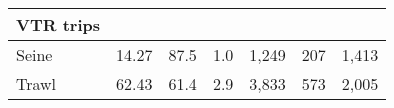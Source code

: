 \documentclass[]{article}
\begin{document}
\begin{longtable}[]{@{}lrrrrrr@{}}
\begin{minipage}[b]{0.08\columnwidth}
VTR trips\strut
\end{minipage}\tabularnewline
\midrule
\endhead
\begin{minipage}[t]{0.07\columnwidth}\raggedright\strut
Seine\strut
\end{minipage} & \begin{minipage}[t]{0.17\columnwidth}\raggedleft\strut
14.27\strut
\end{minipage} & \begin{minipage}[t]{0.11\columnwidth}\raggedleft\strut
87.5\strut
\end{minipage} & \begin{minipage}[t]{0.14\columnwidth}\raggedleft\strut
1.0\strut
\end{minipage} & \begin{minipage}[t]{0.15\columnwidth}\raggedleft\strut
1,249\strut
\end{minipage} & \begin{minipage}[t]{0.09\columnwidth}\raggedleft\strut
207\strut
\end{minipage} & \begin{minipage}[t]{0.08\columnwidth}\raggedleft\strut
1,413\strut
\end{minipage}\tabularnewline
\begin{minipage}[t]{0.07\columnwidth}\raggedright\strut
Trawl\strut
\end{minipage} & \begin{minipage}[t]{0.17\columnwidth}\raggedleft\strut
62.43\strut
\end{minipage} & \begin{minipage}[t]{0.11\columnwidth}\raggedleft\strut
61.4\strut
\end{minipage} & \begin{minipage}[t]{0.14\columnwidth}\raggedleft\strut
2.9\strut
\end{minipage} & \begin{minipage}[t]{0.15\columnwidth}\raggedleft\strut
3,833\strut
\end{minipage} & \begin{minipage}[t]{0.09\columnwidth}\raggedleft\strut
573\strut
\end{minipage} & \begin{minipage}[t]{0.08\columnwidth}\raggedleft\strut
2,005\strut
\end{minipage}\tabularnewline
\bottomrule
\end{longtable}

\newpage
\end{document}
